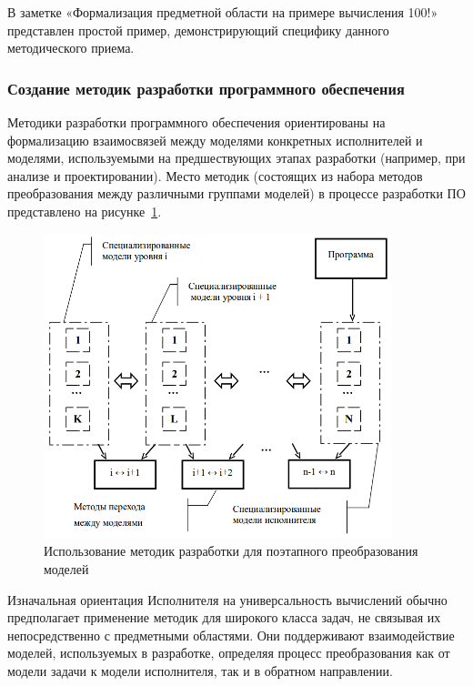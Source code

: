 В заметке «Формализация предметной области на примере вычисления 100!» представлен простой пример, демонстрирующий специфику данного методического приема.

\subsubsection*{Создание методик разработки программного обеспечения}

Методики разработки программного обеспечения ориентированы на формализацию взаимосвязей между моделями конкретных исполнителей и моделями, используемыми на предшествующих этапах разработки (например, при анализе и проектировании). Место методик (состоящих из набора методов преобразования между различными группами моделей) в процессе разработки ПО представлено на рисунке~\ref{fig01-04}.

\begin{figure}[htbp]
    \centering
    \includegraphics[width=0.9\textwidth]{img/fig01-04.png}
    \caption{Использование методик разработки для поэтапного преобразования моделей}
    \label{fig01-04}
\end{figure}

Изначальная ориентация Исполнителя на универсальность вычислений обычно предполагает применение методик для широкого класса задач, не связывая их непосредственно с предметными областями. Они поддерживают взаимодействие моделей, используемых в разработке, определяя процесс преобразования как от модели задачи к модели исполнителя, так и в обратном направлении.

